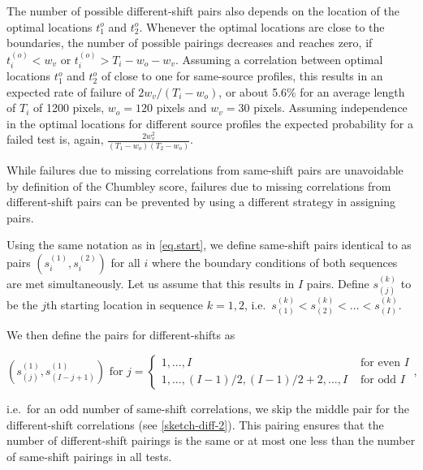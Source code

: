 \documentclass[12pt]{article}
\begin{document}
The number of possible different-shift pairs also depends on the
location of the optimal locations \(t_1^o\) and \(t_2^o\). Whenever the
optimal locations are close to the boundaries, the number of possible
pairings decreases and reaches zero, if \(t_i^{(o)} < w_v\) or
\(t_i^{(o)} > T_i-w_o- w_v\). Assuming a correlation between optimal
locations \(t_1^o\) and \(t_2^o\) of close to one for same-source
profiles, this results in an expected rate of failure of
\(2 w_v / (T_i-w_o)\), or about 5.6\% for an average length of \(T_i\)
of 1200 pixels, \(w_o = 120\) pixels and \(w_v = 30\) pixels. Assuming
independence in the optimal locations for different source profiles the
expected probability for a failed test is, again,
\(\frac{2 w_v^2}{(T_1-w_o)(T_2-w_o)}\).

While failures due to missing correlations from same-shift pairs are
unavoidable by definition of the Chumbley score, failures due to missing
correlations from different-shift pairs can be prevented by using a
different strategy in assigning pairs.

Using the same notation as in \autoref{eq.start}, we define same-shift
pairs identical to \citet{hadler} as pairs \((s_i^{(1)}, s_i^{(2)})\)
for all \(i\) where the boundary conditions of both sequences are met
simultaneously. Let us assume that this results in \(I\) pairs. Define
\(s_{(j)}^{(k)}\) to be the \(j\)th starting location in sequence
\(k = 1, 2\),
i.e.~\(s_{(1)}^{(k)} < s_{(2)}^{(k)} < ... < s_{(I)}^{(k)}\).

We then define the pairs for different-shifts as

\begin{equation}\label{eq.diff2}
\left(s_{(j)}^{(1)}, s_{(I-j+1)}^{(1)} \right) \text{ for } j = 
\begin{cases}
1, ..., I & \text{ for even } I \\
1, ..., (I-1)/2, (I-1)/2 + 2, ..., I & \text{ for odd } I
\end{cases},
\end{equation}

i.e.~for an odd number of same-shift correlations, we skip the middle
pair for the different-shift correlations (see \autoref{sketch-diff-2}).
This pairing ensures that the number of different-shift pairings is the
same or at most one less than the number of same-shift pairings in all
tests.
\end{document}

